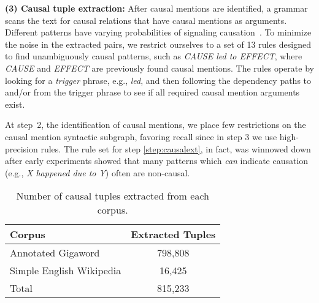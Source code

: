 {\flushleft \textbf{(3) Causal tuple extraction:}} \label{step:causalext} After causal mentions are identified, a grammar scans the text for causal relations that have causal mentions as arguments.  Different patterns have varying probabilities of signaling causation~\citep{khoo1998automatic}.  To minimize the noise in the extracted pairs, we restrict ourselves to a set of 13 rules designed to find unambiguously causal patterns, such as {\em CAUSE led to EFFECT}, where {\em CAUSE} and {\em EFFECT} are previously found causal mentions.
The rules operate by looking for a \emph{trigger} phrase, e.g., {\em led}, and then following the dependency paths to and/or from the trigger phrase to see if all required causal mention arguments exist.

At step~2, the identification of causal mentions, we place few restrictions on the causal mention syntactic subgraph, favoring recall since in step 3 we use high-precision rules.  The rule set for step \ref{step:causalext}, in fact, was winnowed down after early experiments showed that many patterns which \emph{can} indicate causation (e.g., {\em X happened due to Y}) often are non-causal.  

\begin{table}[t!]
\begin{center}
\begin{tabular}{lc}
\hline
Corpus		&	Extracted Tuples		 \\
\hline
Annotated Gigaword	& 798,808 	\\
Simple English Wikipedia		& 16,425 	\\
\hline
Total		& 815,233 	\\
\end{tabular}
\caption{{\footnotesize Number of causal tuples extracted from each corpus.}} 
\label{tab:causalstats}
\end{center}
\end{table}

